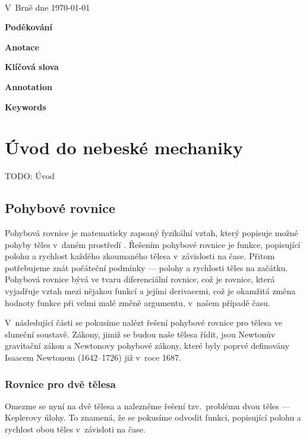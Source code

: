 \documentclass[A4paper, 12pt, oneside]{book}
\begin{document}
\

V~Brně dne \today\ \dotfill \hspace{10mm}

\newpage

{\large \bfseries Poděkování}

\newpage

{\large \bfseries Anotace}

{\large \bfseries Klíčová slova}

{\large \bfseries Annotation}

{\large \bfseries Keywords}

\newpage

\tableofcontents

\newpage

\chapter{Úvod do nebeské mechaniky}
TODO: Úvod
\vspace{40mm}
\section{Pohybové rovnice}
Pohybová rovnice je matematicky zapsaný fyzikální vztah, který popisuje možné pohyby těles v~daném prostředí \cite{wiki:eqm}. Řešením pohybové rovnice je funkce, popisující polohu a rychlost každého zkoumaného tělesa v~závislosti na čase. Přitom potřebujeme znát počáteční podmínky --- polohy a rychlosti těles na začátku. Pohybová rovnice bývá ve tvaru diferenciální rovnice, což je rovnice, která vyjadřuje vztah mezi nějakou funkcí a jejími derivacemi, což je okamžitá změna hodnoty funkce při velmi malé změně argumentu, v~našem případě času. 

V~následující části se pokusíme nalézt řešení pohybové rovnice pro tělesa ve sluneční soustavě. Zákony, jimiž se budou naše tělesa řídit, jsou Newtonův gravitační zákon a Newtonovy pohybové zákony, které byly poprvé definovány Isaacem Newtonem (1642--1726) již v~roce 1687.
\subsection{Rovnice pro dvě tělesa} \label{sec:2body}
Omezme se nyní na dvě tělesa a nalezněme řešení tzv.\ problému dvou těles --- Keplerovy úlohy. To znamená, že se pokusíme odvodit funkci, popisující polohu a rychlost obou těles v~závisloti na čase. 
\end{document}
